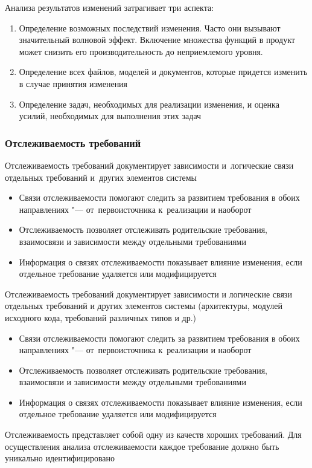 \documentclass{../industrial-development}
\begin{document}
Анализа результатов изменений затрагивает три аспекта:
	\begin{enumerate}
\item Определение возможных последствий изменения. Часто они вызывают значительный волновой эффект. Включение множества функций в продукт может снизить его производительность до неприемлемого уровня.
\item Определение всех файлов, моделей и документов, которые придется изменить в случае принятия изменения
\item Определение задач, необходимых для реализации изменения, и оценка усилий, необходимых для выполнения этих задач
  	\end{enumerate}




\begin{frame} \frametitle{Отслеживаемость требований}
  \begin{block}{}
Отслеживаемость требований документирует зависимости и~логические связи отдельных требований и~других элементов системы
  \end{block}
	\begin{itemize}
\item Связи отслеживаемости помогают следить за развитием требования в обоих направлениях "--- от~первоисточника к~реализации и наоборот 
\item Отслеживаемость позволяет отслеживать родительские требования, взаимосвязи и зависимости между отдельными требованиями
\item Информация о связях отслеживаемости показывает влияние изменения, если отдельное требование удаляется или модифицируется
  	\end{itemize}
\end{frame}

\lecturenotes

Отслеживаемость требований документирует зависимости и логические связи отдельных требований и других элементов системы (архитектуры, модулей исходного кода, требований различных типов и др.)
	\begin{itemize}
\item Связи отслеживаемости помогают следить за развитием требования в обоих направлениях "--- от~первоисточника к~реализации и наоборот 
\item Отслеживаемость позволяет отслеживать родительские требования, взаимосвязи и зависимости между отдельными требованиями
\item Информация о связях отслеживаемости показывает влияние изменения, если отдельное требование удаляется или модифицируется
  	\end{itemize}
Отслеживаемость представляет собой одну из качеств хороших требований. Для осуществления анализа отслеживаемости каждое требование должно быть уникально идентифицировано~\cite[с.~77]{Maglinec}
\end{document}
